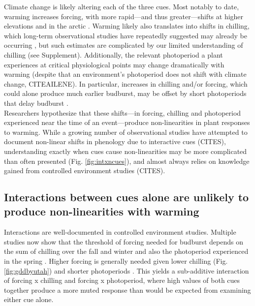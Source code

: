 \documentclass[11pt,letter]{article}
\begin{document}
Climate change is likely altering each of the three cues. Most notably to date, warming increases forcing, with more rapid---and thus greater---shifts at higher elevations and in the arctic \citep{IPCC:2014sm}. Warming likely also translates into shifts in chilling, which long-term observational studies have repeatedly suggested may already be occurring \citep{fu2015,piao2017}, but such estimates are complicated by our limited understanding of chilling (see Supplement). Additionally, the relevant photoperiod a plant experiences at critical physiological points may change dramatically with warming (despite that an environment's photoperiod does not shift with climate change, CITEAILENE). In particular, increases in chilling and/or forcing, which could alone produce much earlier budburst, may be offset by short photoperiods that delay budburst \citep{gauzere2019}. \\ %

Researchers hypothesize that these shifts---in forcing, chilling and photoperiod experienced near the time of an event---produce non-linearities in plant responses to warming. While a growing number of observational studies have attempted to document non-linear shifts in phenology due to interactive cues (CITES), understanding exactly when cues cause non-linearities may be more complicated than often presented (Fig. \ref{fig:intxncues}), and almost always relies on knowledge gained from controlled environment studies (CITES). 

\subsection{Interactions between cues alone are unlikely to produce non-linearities with warming}
Interactions are well-documented in controlled environment studies. Multiple studies now show that the threshold of forcing needed for budburst depends on the sum of chilling over the fall and winter and also the photoperiod experienced in the spring \citep[e.g.,][]{zohner2014,flynn2018}. Higher forcing is generally needed given lower chilling (Fig. \ref{fig:gddbyutah}) and shorter photoperiods \citep{Basler:2014aa,fu2019}. This yields a sub-additive interaction of forcing x chilling and forcing x photoperiod, where high values of both cues together produce a more muted response than would be expected from examining either cue alone.\\
\end{document}
